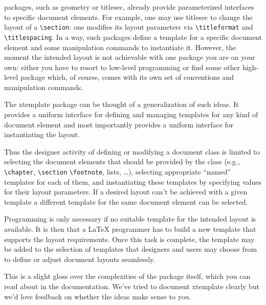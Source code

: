 \documentclass{ltnews}
\begin{document}
\LaTeXe{} packages, such as \textsf{geometry} or \textsf{titlesec}, already provide
parameterized interfaces to specific document elements.  For example,
one may use \textsf{titlesec} to change the
layout of a \verb|\section|: one modifies its layout parameters via \verb|\titleformat| and \verb|\titlespacing|.
In a way, such packages define a template for a specific document element and
some manipulation commands to instantiate it. 
\pagebreak
However, the moment the intended
layout is not achievable with one package you are on your own: either you have
to resort to low-level programming or find some other high-level package which, of course, comes with its own set of conventions and manipulation commands.

The \textsf{xtemplate} package can be thought of a generalization of such
ideas. It provides a uniform interface for defining and managing templates for
any kind of document element and most importantly provides a uniform interface
for instantiating the layout.

Thus the designer activity of defining or modifying a document class is
limited to selecting the document elements that should be provided by the
class (e.g., \verb|\chapter|, \verb|\section| \verb|\footnote|, lists, \ldots), selecting
appropriate ``named'' templates for each of them, and instantiating these
templates by specifying values for their layout parameters. If a desired
layout can't be achieved with a given template a different template for the
same document element can be selected. 

Programming is only necessary
if no suitable template for the intended layout is available.
It is then that a \LaTeX{} programmer has to build a new template
that supports the layout requirements. Once this task is complete, the
template may be
added to the selection of templates that designers and users may choose from
to define or adjust document layouts seamlessly.

This is a slight gloss over the complexities of the package itself, which you can read about in the documentation. We've tried to document \textsf{xtemplate} clearly but we'd love feedback on whether the ideas make sense to you.
\end{document}
